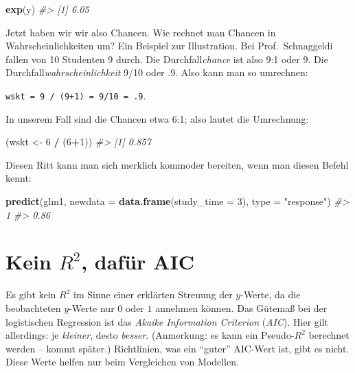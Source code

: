 \documentclass[12pt,ngerman,]{book}
\makeatletter
\newenvironment{Shaded}{\begin{snugshade}}{\end{snugshade}}
\newcommand{\KeywordTok}[1]{\textcolor[rgb]{0.13,0.29,0.53}{\textbf{#1}}}
\newcommand{\DataTypeTok}[1]{\textcolor[rgb]{0.13,0.29,0.53}{#1}}
\newcommand{\DecValTok}[1]{\textcolor[rgb]{0.00,0.00,0.81}{#1}}
\newcommand{\StringTok}[1]{\textcolor[rgb]{0.31,0.60,0.02}{#1}}
\newcommand{\CommentTok}[1]{\textcolor[rgb]{0.56,0.35,0.01}{\textit{#1}}}
\newcommand{\OperatorTok}[1]{\textcolor[rgb]{0.81,0.36,0.00}{\textbf{#1}}}
\newcommand{\NormalTok}[1]{#1}
\newenvironment{kframe}{%
\medskip{}
\setlength{\fboxsep}{.8em}
 \def\at@end@of@kframe{}%
 \ifinner\ifhmode%
  \def\at@end@of@kframe{\end{minipage}}%
  \begin{minipage}{\columnwidth}%
 \fi\fi%
 \def\FrameCommand##1{\hskip\@totalleftmargin \hskip-\fboxsep
 \colorbox{shadecolor}{##1}\hskip-\fboxsep
     \hskip-\linewidth \hskip-\@totalleftmargin \hskip\columnwidth}%
 \MakeFramed {\advance\hsize-\width
   \@totalleftmargin\z@ \linewidth\hsize
   \@setminipage}}%
 {\par\unskip\endMakeFramed%
 \at@end@of@kframe}
\renewenvironment{Shaded}{\begin{kframe}}{\end{kframe}}
\theoremstyle{definition}
\theoremstyle{definition}
\theoremstyle{remark}
\makeatother
\begin{document}
\begin{Shaded}
\begin{Highlighting}[]
\KeywordTok{exp}\NormalTok{(y)}
\CommentTok{#> [1] 6.05}
\end{Highlighting}
\end{Shaded}

Jetzt haben wir wir also Chancen. Wie rechnet man Chancen in
Wahrscheinlichkeiten um? Ein Beispiel zur Illustration. Bei
Prof.~Schnaggeldi fallen von 10 Studenten 9 durch. Die
Durchfall\emph{chance} ist also 9:1 oder 9. Die
Durchfall\emph{wahrscheinlichkeit} 9/10 oder .9. Also kann man so
umrechnen:

\texttt{wskt\ =\ 9\ /\ (9+1)\ =\ 9/10\ =\ .9}.

In unserem Fall sind die Chancen etwa 6:1; also lautet die Umrechnung:

\begin{Shaded}
\begin{Highlighting}[]
\NormalTok{(wskt <-}\StringTok{ }\DecValTok{6} \OperatorTok{/}\StringTok{ }\NormalTok{(}\DecValTok{6}\OperatorTok{+}\DecValTok{1}\NormalTok{))}
\CommentTok{#> [1] 0.857}
\end{Highlighting}
\end{Shaded}

Diesen Ritt kann man sich merklich kommoder bereiten, wenn man diesen
Befehl kennt:

\begin{Shaded}
\begin{Highlighting}[]
\KeywordTok{predict}\NormalTok{(glm1, }\DataTypeTok{newdata =} \KeywordTok{data.frame}\NormalTok{(}\DataTypeTok{study_time =} \DecValTok{3}\NormalTok{), }\DataTypeTok{type =} \StringTok{"response"}\NormalTok{)}
\CommentTok{#>    1 }
\CommentTok{#> 0.86}
\end{Highlighting}
\end{Shaded}

\section{\texorpdfstring{Kein \(R^2\), dafür
AIC}{Kein R\^{}2, dafür AIC}}\label{kein-r2-dafur-aic}

Es gibt kein \(R^2\) im Sinne einer erklärten Streuung der \(y\)-Werte,
da die beobachteten \(y\)-Werte nur \(0\) oder \(1\) annehmen können.
Das Gütemaß bei der logistischen Regression ist das \emph{Akaike
Information Criterion} (\emph{AIC}). Hier gilt allerdings: je
\emph{kleiner}, desto \emph{besser}. (Anmerkung: es kann ein
Pseudo-\(R^2\) berechnet werden -- kommt später.) Richtlinien, was ein
``guter'' AIC-Wert ist, gibt es nicht. Diese Werte helfen nur beim
Vergleichen von Modellen.
\end{document}

